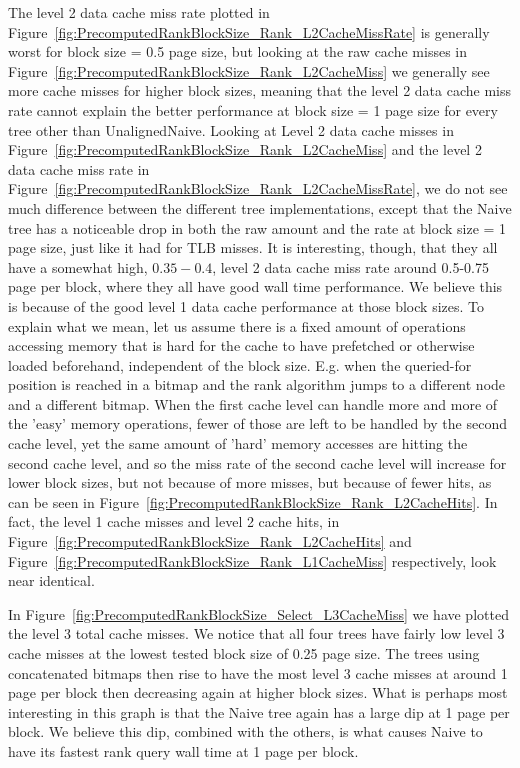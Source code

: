 The level 2 data cache miss rate plotted in Figure~\ref{fig:PrecomputedRankBlockSize_Rank_L2CacheMissRate} is generally worst for block size = 0.5 page size, but looking at the raw cache misses in Figure~\ref{fig:PrecomputedRankBlockSize_Rank_L2CacheMiss} we generally see more cache misses for higher block sizes, meaning that the level 2 data cache miss rate cannot explain the better performance at block size = 1 page size for every tree other than UnalignedNaive.
Looking at Level 2 data cache misses in Figure~\ref{fig:PrecomputedRankBlockSize_Rank_L2CacheMiss} and the level 2 data cache miss rate in Figure~\ref{fig:PrecomputedRankBlockSize_Rank_L2CacheMissRate}, we do not see much difference between the different tree implementations, except that the Naive tree has a noticeable drop in both the raw amount and the rate at block size = 1 page size, just like it had for TLB misses.
It is interesting, though, that they all have a somewhat high, $0.35-0.4$, level 2 data cache miss rate around 0.5-0.75 page per block, where they all have good wall time performance.
We believe this is because of the good level 1 data cache performance at those block sizes.
To explain what we mean, let us assume there is a fixed amount of operations accessing memory that is hard for the cache to have prefetched or otherwise loaded beforehand, independent of the block size.
E.g. when the queried-for position is reached in a bitmap and the rank algorithm jumps to a different node and a different bitmap.
When the first cache level can handle more and more of the 'easy' memory operations, fewer of those are left to be handled by the second cache level, yet the same amount of 'hard' memory accesses are hitting the second cache level, and so the miss rate of the second cache level will increase for lower block sizes, but not because of more misses, but because of fewer hits, as can be seen in Figure~\ref{fig:PrecomputedRankBlockSize_Rank_L2CacheHits}.
In fact, the level 1 cache misses and level 2 cache hits, in Figure~\ref{fig:PrecomputedRankBlockSize_Rank_L2CacheHits} and Figure~\ref{fig:PrecomputedRankBlockSize_Rank_L1CacheMiss} respectively, look near identical.

In Figure~\ref{fig:PrecomputedRankBlockSize_Select_L3CacheMiss} we have plotted the level 3 total cache misses.
We notice that all four trees have fairly low level 3 cache misses at the lowest tested block size of 0.25 page size.
The trees using concatenated bitmaps then rise to have the most level 3 cache misses at around 1 page per block then decreasing again at higher block sizes.
What is perhaps most interesting in this graph is that the Naive tree again has a large dip at 1 page per block.
We believe this dip, combined with the others, is what causes Naive to have its fastest rank query wall time at 1 page per block.


